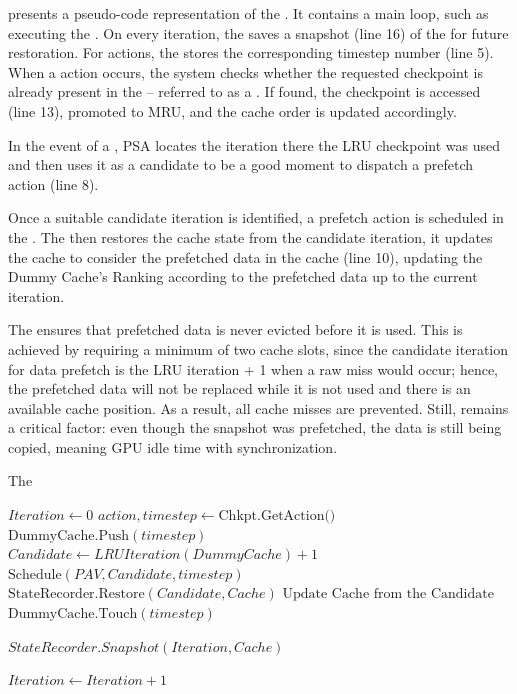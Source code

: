 \documentclass[Ingles,Final]{ic-tese-v3}
\begin{document}
 presents a pseudo-code representation of the \psa. It contains a main loop, such as executing the \checkpointing. On every iteration, the  saves a snapshot (line 16) of the \cache for future restoration. For \save actions, the  stores the corresponding timestep number (line 5). When a \restore action occurs, the system checks whether the requested checkpoint is already present in the  -- referred to as a . If found, the checkpoint is accessed (line 13), promoted to MRU, and the cache order is updated accordingly.

In the event of a , PSA locates the iteration there the LRU checkpoint was used and then uses it as a candidate to be a good moment to dispatch a prefetch action (line 8).

Once a suitable candidate iteration is identified, a prefetch action is scheduled in the \pav. The  then restores the cache state from the candidate iteration, it updates the cache to consider the prefetched data in the cache (line 10), updating the Dummy Cache's Ranking according to the prefetched data up to the current iteration.

The \psa ensures that prefetched data is never evicted before it is used. This is achieved by requiring a minimum of two cache slots, since the candidate iteration for data prefetch is the LRU iteration + 1 when a raw miss would occur; hence, the prefetched data will not be replaced while it is not used and there is an available cache position. As a result, all cache misses are prevented. Still,  remains a critical factor: even though the snapshot was prefetched, the data is still being copied, meaning GPU idle time with synchronization.


\begin{algorithm}[H]
\caption{The \psa}
\label{alg:setup}
\begin{algorithmic}[1]
    \STATE $Iteration \gets 0$
    \REPEAT
        \STATE $action, timestep \gets \text{Chkpt.GetAction()}$
            \STATE $\text{DummyCache.Push}(timestep)$
                \STATE $Candidate \gets LRUIteration(DummyCache) + 1$
                \STATE $\text{Schedule}(PAV, Candidate, timestep)$
                \STATE $\text{StateRecorder.Restore}(Candidate, Cache)$
                \STATE $\text{Update Cache from the Candidate}$
            \ELSE
                \STATE $\text{DummyCache.Touch}(timestep)$ 
            \ENDIF
        \ENDIF

        \STATE $StateRecorder.Snapshot(Iteration, Cache)$

        \STATE $Iteration \gets Iteration + 1$
\end{algorithmic}
\end{algorithm}
\end{document}
